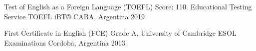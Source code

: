 

\begin{cvhonors}

  \cvhonor
    {Test of English as a Foreign Language (TOEFL)} %
    {Score: 110. Educational Testing Service TOEFL iBT®} %
    {CABA, Argentina} %
    {2019} %

  \cvhonor
    {First Certificate in English (FCE)} %
    {Grade A, University of Cambridge ESOL Examinations} %
    {Cordoba, Argentina} %
    {2013} %

\end{cvhonors}
